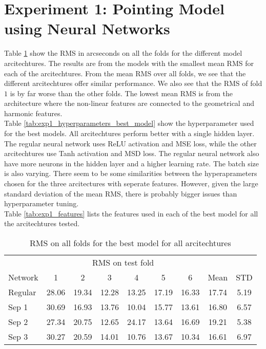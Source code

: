 
\section{Experiment 1: Pointing Model using Neural Networks}

Table \ref{tab:exp1_rms_folds_best_model} show the RMS in arcseconds on all the folds for the different model arcitechtures.
The results are from the models with the smallest mean RMS for each of the arcitechtures.
From the mean RMS over all folds, we see that the different arcitechtures offer similar performance.
We also see that the RMS of fold $1$ is by far worse than the other folds.
The lowest mean RMS is from the architecture where the non-linear features are connected to the geometrical and harmonic features.\\

Table \ref{tab:exp1_hyperparameters_best_model} show the hyperparameter used for the best models.
All arcitechtures perform better with a single hidden layer.
The regular neural network uses ReLU activation and MSE loss, while the other arcitechtures use Tanh activation and MSD loss.
The regular neural network also have more neurons in the hidden layer and a higher learning rate.
The batch size is also varying. There seem to be some similarities between the hyperaprameters chosen for the three arcitectures with seperate features.
However, given the large standard deviation of the mean RMS, there is probably bigger issues than hyperparameter tuning.\\

Table \ref{tab:exp1_features} lists the features used in each of the best model for all the arcitechtures tested.

\begin{table}[!htbp]
    \centering
    \caption{RMS on all folds for the best model for all arcitechtures}
    \begin{tabular}{lcccccccc}
        \toprule
        & \multicolumn{6}{c}{RMS on test fold} & & \\
        \cmidrule(lr){2-7}
        Network & 1 & 2 & 3 & 4 & 5 & 6 & Mean & STD\\
        \midrule
        Regular & 28.06 & 19.34 & 12.28 & 13.25 & 17.19 & 16.33 & 17.74 & 5.19 \\
        Sep 1 & 30.69 & 16.93 & 13.76 & 10.04 & 15.77 & 13.61 & 16.80 & 6.57 \\
        Sep 2 & 27.34 & 20.75 & 12.65 & 24.17 & 13.64 & 16.69 & 19.21 & 5.38 \\
        Sep 3 & 30.27 & 20.59 & 14.01 & 10.76 & 13.67 & 10.34 & 16.61 & 6.97 \\
        \bottomrule
    \end{tabular}
    \label{tab:exp1_rms_folds_best_model}
\end{table}

